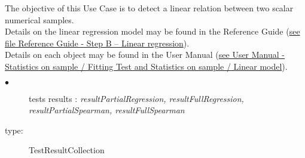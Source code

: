 \renewcommand{\filename}{docUC_InputWithData_RegressionTest.tex}
\renewcommand{\filetitle}{UC : Regression test between two scalar numerical samples}

\HeaderIIILevel






The objective of this Use Case is to detect a linear relation between two scalar numerical samples. \\



Details on the linear regression model  may be found in the Reference Guide (\href{OpenTURNS_ReferenceGuide.pdf}{see file Reference Guide - Step B -- Linear regression}).\\

Details on each object may be found in the User Manual  (\href{OpenTURNS_UserManual_TUI.pdf}{see User Manual - Statistics on sample / Fitting Test and Statistics on sample / Linear model}).\\





{
  \begin{description}
  \item[$\bullet$] tests results : {\itshape resultPartialRegression, resultFullRegression, resultPartialSpearman, resultFullSpearman}
  \item[type:] TestResultCollection
  \end{description}
}

